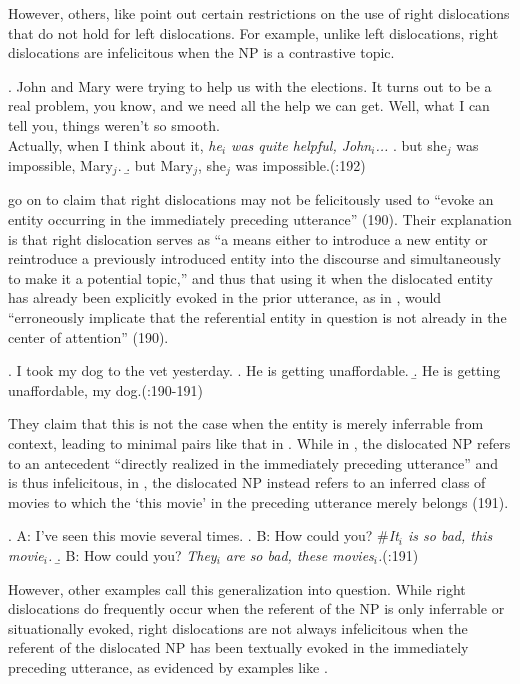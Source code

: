 \documentclass[titlepage,12pt]{article}
\def\infelic{{\leavevmode\llap{\#}}}
\begin{document}
However, others, like \citet{ziv_right_1994} point out certain restrictions on the use of right dislocations that do not hold for left dislocations. For example, unlike left dislocations, right dislocations are infelicitous when the NP is a contrastive topic.

\ex. John and Mary were trying to help us with the elections. It turns out to be a real problem, you know, and we need all the help we can get. Well, what I can tell you, things weren't so smooth. \\
Actually, when I think about it, \textit{he$_i$ was quite helpful, John$_i$...}
\a. \infelic but she$_j$ was impossible, Mary$_j$.
\b. but Mary$_j$, she$_j$ was impossible.\hfill (\citealt{ziv_right_1994}:192)

\citeauthor{ziv_right_1994} go on to claim that right dislocations may not be felicitously used to ``evoke an entity occurring in the immediately preceding utterance'' (190). Their explanation is that right dislocation serves as ``a means either to introduce a new entity or reintroduce a previously introduced entity into the discourse and simultaneously to make it a potential topic,'' and thus that using it when the dislocated entity has already been explicitly evoked in the prior utterance, as in \Next[b], would ``erroneously implicate that the referential entity in question is not already in the center of attention'' (190). 

\ex. I took my dog to the vet yesterday.
\a. He is getting unaffordable.
\b. \infelic He is getting unaffordable, my dog.\hfill (\citealt{ziv_right_1994}:190-191)

They claim that this is not the case when the entity is merely inferrable from context, leading to minimal pairs like that in \Next. While in \Next[a], the dislocated NP refers to an antecedent ``directly realized in the immediately preceding utterance'' and is thus infelicitous, in \Next[b], the dislocated NP instead refers to an inferred class of movies to which the `this movie' in the preceding utterance merely belongs (191).

\ex. A: I've seen this movie several times.
\a. B: How could you? \#\textit{It$_i$ is so bad, this movie$_i$.}
\b. B: How could you? \textit{They$_i$ are so bad, these movies$_i$.}\hfill (\citealt{ziv_right_1994}:191)

\par
However, other examples call this generalization into question. While right dislocations do frequently occur when the referent of the NP is only inferrable or situationally evoked, right dislocations are not always infelicitous when the referent of the dislocated NP has been textually evoked in the immediately preceding utterance, as evidenced by examples like \Next.
\end{document}
